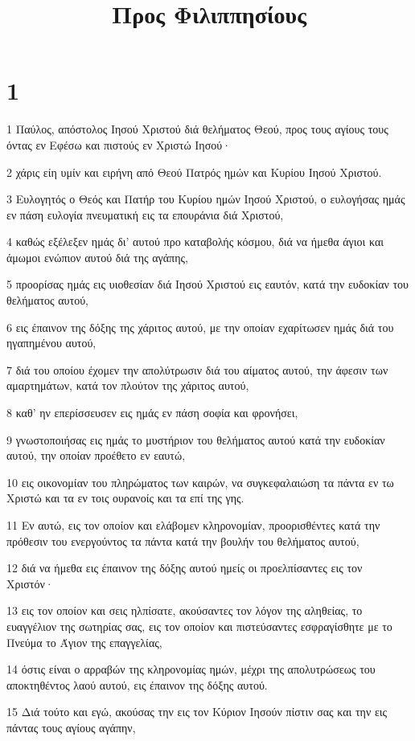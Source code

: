 

\title{Προς Φιλιππησίους}


\chapter{1}

\par 1 Παύλος, απόστολος Ιησού Χριστού διά θελήματος Θεού, προς τους αγίους τους όντας εν Εφέσω και πιστούς εν Χριστώ Ιησού·
\par 2 χάρις είη υμίν και ειρήνη από Θεού Πατρός ημών και Κυρίου Ιησού Χριστού.
\par 3 Ευλογητός ο Θεός και Πατήρ του Κυρίου ημών Ιησού Χριστού, ο ευλογήσας ημάς εν πάση ευλογία πνευματική εις τα επουράνια διά Χριστού,
\par 4 καθώς εξέλεξεν ημάς δι' αυτού προ καταβολής κόσμου, διά να ήμεθα άγιοι και άμωμοι ενώπιον αυτού διά της αγάπης,
\par 5 προορίσας ημάς εις υιοθεσίαν διά Ιησού Χριστού εις εαυτόν, κατά την ευδοκίαν του θελήματος αυτού,
\par 6 εις έπαινον της δόξης της χάριτος αυτού, με την οποίαν εχαρίτωσεν ημάς διά του ηγαπημένου αυτού,
\par 7 διά του οποίου έχομεν την απολύτρωσιν διά του αίματος αυτού, την άφεσιν των αμαρτημάτων, κατά τον πλούτον της χάριτος αυτού,
\par 8 καθ' ην επερίσσευσεν εις ημάς εν πάση σοφία και φρονήσει,
\par 9 γνωστοποιήσας εις ημάς το μυστήριον του θελήματος αυτού κατά την ευδοκίαν αυτού, την οποίαν προέθετο εν εαυτώ,
\par 10 εις οικονομίαν του πληρώματος των καιρών, να συγκεφαλαιώση τα πάντα εν τω Χριστώ και τα εν τοις ουρανοίς και τα επί της γης.
\par 11 Εν αυτώ, εις τον οποίον και ελάβομεν κληρονομίαν, προορισθέντες κατά την πρόθεσιν του ενεργούντος τα πάντα κατά την βουλήν του θελήματος αυτού,
\par 12 διά να ήμεθα εις έπαινον της δόξης αυτού ημείς οι προελπίσαντες εις τον Χριστόν·
\par 13 εις τον οποίον και σεις ηλπίσατε, ακούσαντες τον λόγον της αληθείας, το ευαγγέλιον της σωτηρίας σας, εις τον οποίον και πιστεύσαντες εσφραγίσθητε με το Πνεύμα το Άγιον της επαγγελίας,
\par 14 όστις είναι ο αρραβών της κληρονομίας ημών, μέχρι της απολυτρώσεως του αποκτηθέντος λαού αυτού, εις έπαινον της δόξης αυτού.
\par 15 Διά τούτο και εγώ, ακούσας την εις τον Κύριον Ιησούν πίστιν σας και την εις πάντας τους αγίους αγάπην,

